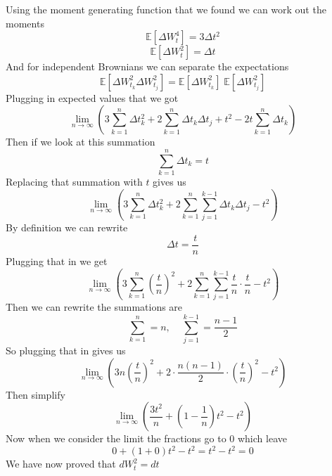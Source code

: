 \documentclass{article}
\begin{document}
Using the moment generating function that we found we can work out the moments
$$
\mathbb{E} \left[ \Delta W_t^4 \right] = 3 \Delta t^2
$$
$$
\mathbb{E} \left[ \Delta W_t^2 \right] = \Delta t
$$
And for independent Brownians we can separate the expectations
$$
\mathbb{E} \left[ \Delta W_{t_k}^2 \Delta W_{t_j}^2 \right] = \mathbb{E} [ \Delta W_{t_k}^2] \;  \mathbb{E} [ \Delta W_{t_j}^2 ]
$$
Plugging in expected values that we got
$$
\lim_{n \to \infty} \left( 3 \sum_{k=1}^n \Delta t_k^2 + 2 \sum_{k=1}^n \Delta t_k \Delta t_j + t^2 - 2t \sum_{k=1}^n \Delta t_k \right)
$$
Then if we look at this summation
$$
\sum_{k=1}^n \Delta t_k = t
$$
Replacing that summation with $t$ gives us
$$
\lim_{n \to \infty} \left( 3 \sum_{k=1}^n \Delta t_k^2 + 2 \sum_{k=1}^n \sum_{j=1}^{k-1} \Delta t_k \Delta t_j - t^2 \right)
$$
By definition we can rewrite 
$$
\Delta t = \frac{t}{n}
$$
Plugging that in we get
$$
\lim_{n \to \infty} \left( 3 \sum_{k=1}^n \left( \frac{t}{n} \right)^2 + 2 \sum_{k=1}^n \sum_{j=1}^{k-1} \frac{t}{n} \cdot \frac{t}{n} - t^2 \right)
$$
Then we can rewrite the summations are 
$$
\sum_{k=1}^n = n, \; \; \; \; \sum_{j=1}^{k-1} = \frac{n-1}{2}
$$
So plugging that in gives us
$$
\lim_{n \to \infty} \left( 3n \left( \frac{t}{n} \right)^2 + 2 \cdot \frac{n (n-1)}{2} \cdot \left( \frac{t}{n} \right)^2 - t^2 \right)
$$
Then simplify
$$
\lim_{n \to \infty} \left( \frac{3t^2}{n} + \left( 1 - \frac{1}{n} \right)t^2 - t^2 \right)
$$
Now when we consider the limit the fractions go to 0 which leave
$$
0 + (1 + 0)t^2 -t^2 = t^2 - t^2 = 0
$$
We have now proved that $dW_t^2 = dt$
\end{document}

